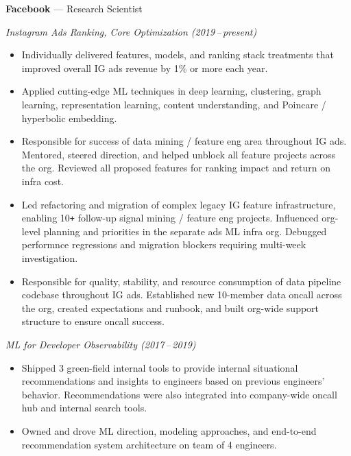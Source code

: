 \documentclass[10pt,letterpaper]{article}
\newcommand{\dates}[1]{\item[#1\hfill]}
\newcommand{\jobhead}[3]{{\dates{#1}{\bf #2} --- {#3}}}
\newcommand{\jobsubhead}[2]{{{\it #2 (#1)}}}
\newenvironment{jobs}
  {\leftmargini=24.1mm%
   \begin{list}%
    {}
    {\setlength\labelwidth{22mm}\itemsep=1.5mm}}
  {\end{list}}
\begin{document}
\begin{jobs}

\jobhead{2017\,--\,present} {Facebook}{Research Scientist}

\jobsubhead{2019\,--\,present}{Instagram Ads Ranking, Core Optimization}

\begin{itemize}
\item Individually delivered features, models, and ranking stack treatments that improved
	overall IG ads revenue by 1\% or more each year.

\item Applied cutting-edge ML techniques in deep learning, clustering, graph
	learning, representation learning, content understanding, and Poincare
	/ hyperbolic embedding.

\item Responsible for success of data mining / feature eng area throughout IG ads. Mentored, steered
	direction, and helped unblock all feature projects across the org.
	Reviewed all proposed features for ranking impact and return on infra cost.

\item Led refactoring and migration of complex legacy IG feature infrastructure,
	enabling 10\verb!+! follow-up signal mining / feature eng projects.
	Influenced org-level planning and priorities
	in the separate ads ML infra org. Debugged
	performnce regressions and migration blockers requiring multi-week investigation.

\item Responsible for quality, stability, and resource consumption of data
	pipeline codebase throughout IG ads. Established new 10-member data oncall across the
	org, created expectations and runbook, and built org-wide support structure
	to ensure oncall success.

\end{itemize}

\jobsubhead{2017\,--\,2019}{ML for Developer Observability}
\begin{itemize}

\item Shipped 3 green-field internal tools to provide internal situational
	recommendations and insights to engineers based on previous
	engineers' behavior. Recommendations were also integrated into company-wide oncall hub and
	internal search tools.

\item Owned and drove ML direction, modeling approaches, and end-to-end
	recommendation system architecture on team of 4 engineers.


\end{itemize}
\end{jobs}
\end{document}
